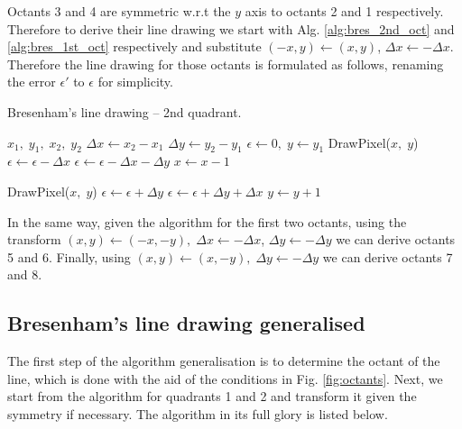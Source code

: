 \documentclass[a4paper]{article}
\begin{document}
Octants 3 and 4 are symmetric w.r.t the $y$ axis to octants 2 and 1 respectively. Therefore to derive their line drawing we start with Alg. \ref{alg:bres_2nd_oct} and \ref{alg:bres_1st_oct} respectively and substitute $(-x,y) \leftarrow (x,y)$, $\Delta x \leftarrow -\Delta x$. Therefore the line drawing for those octants is formulated as follows, renaming the error $\epsilon'$ to $\epsilon$ for simplicity.
\begin{algorithm}[H]
\caption{Bresenham's line drawing -- 2nd quadrant.}
\label{alg:bres_2nd_qd}
\begin{algorithmic}[1]
 {$x_1,\; y_1,\; x_2,\; y_2$} 
	\State $\Delta x \leftarrow x_2 - x_1$
	\State $\Delta y \leftarrow y_2 - y_1$
	\State $\epsilon \leftarrow 0, \; y\leftarrow y_1$ 
	 
			\State DrawPixel($x,\; y$)
				\State $\epsilon \leftarrow \epsilon - \Delta x$ 
			\Else
				\State $\epsilon \leftarrow \epsilon - \Delta x - \Delta y$ 
				\State $x\leftarrow x - 1$
			\EndIf
		\EndFor
	 
			
			\State DrawPixel($x,\; y$)
				\State $\epsilon \leftarrow \epsilon + \Delta y$
			\Else
				\State $\epsilon \leftarrow \epsilon + \Delta y + \Delta x$ 
				\State $y\leftarrow y + 1$
			\EndIf
		\EndFor
	\EndIf
	\EndIf
\EndProcedure

\end{algorithmic}
\end{algorithm}
In the same way, given the algorithm for the first two octants, using the transform $(x,y) \leftarrow (-x,-y), \; \Delta x \leftarrow -\Delta x$, $\Delta y \leftarrow -\Delta y$ we can derive octants 5 and 6. Finally, using $(x,y) \leftarrow (x,-y), \; \Delta y \leftarrow -\Delta y$ we can derive octants 7 and 8.


\subsection{Bresenham's line drawing generalised}

The first step of the algorithm generalisation is to determine the octant of the line, which is done with the aid of the conditions in Fig. \ref{fig:octants}. Next, we start from the algorithm for quadrants 1 and 2 and transform it given the symmetry if necessary. The algorithm in its full glory is listed below.
\end{document}
